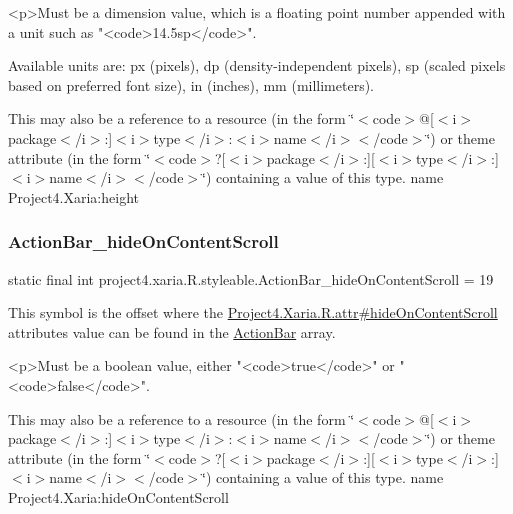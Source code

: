 \begin{DoxyVerb}      <p>Must be a dimension value, which is a floating point number appended with a unit such as "<code>14.5sp</code>".
\end{DoxyVerb}
 Available units are\+: px (pixels), dp (density-\/independent pixels), sp (scaled pixels based on preferred font size), in (inches), mm (millimeters). 

This may also be a reference to a resource (in the form \char`\"{}$<$code$>$@\mbox{[}$<$i$>$package$<$/i$>$\+:\mbox{]}$<$i$>$type$<$/i$>$\+:$<$i$>$name$<$/i$>$$<$/code$>$\char`\"{}) or theme attribute (in the form \char`\"{}$<$code$>$?\mbox{[}$<$i$>$package$<$/i$>$\+:\mbox{]}\mbox{[}$<$i$>$type$<$/i$>$\+:\mbox{]}$<$i$>$name$<$/i$>$$<$/code$>$\char`\"{}) containing a value of this type.  name Project4.\+Xaria\+:height \mbox{\label{classproject4_1_1xaria_1_1R_1_1styleable_a7689152e199aa4b0e5ce73fa3c45f32e}} 
\subsubsection{\texorpdfstring{Action\+Bar\+\_\+hide\+On\+Content\+Scroll}{ActionBar\_hideOnContentScroll}}
{\footnotesize\ttfamily static final int project4.\+xaria.\+R.\+styleable.\+Action\+Bar\+\_\+hide\+On\+Content\+Scroll = 19\hspace{0.3cm}{\ttfamily [static]}}

This symbol is the offset where the \hyperlink{}{Project4.\+Xaria.\+R.\+attr\#hide\+On\+Content\+Scroll} attribute\textquotesingle{}s value can be found in the \hyperlink{classproject4_1_1xaria_1_1R_1_1styleable_accb530194c58ee3abb15587da8869e99}{Action\+Bar} array.

\begin{DoxyVerb}      <p>Must be a boolean value, either "<code>true</code>" or "<code>false</code>".
\end{DoxyVerb}
 

This may also be a reference to a resource (in the form \char`\"{}$<$code$>$@\mbox{[}$<$i$>$package$<$/i$>$\+:\mbox{]}$<$i$>$type$<$/i$>$\+:$<$i$>$name$<$/i$>$$<$/code$>$\char`\"{}) or theme attribute (in the form \char`\"{}$<$code$>$?\mbox{[}$<$i$>$package$<$/i$>$\+:\mbox{]}\mbox{[}$<$i$>$type$<$/i$>$\+:\mbox{]}$<$i$>$name$<$/i$>$$<$/code$>$\char`\"{}) containing a value of this type.  name Project4.\+Xaria\+:hide\+On\+Content\+Scroll \mbox{\label{classproject4_1_1xaria_1_1R_1_1styleable_ab5053df37af5d2ea8d603211b589c775}} 
